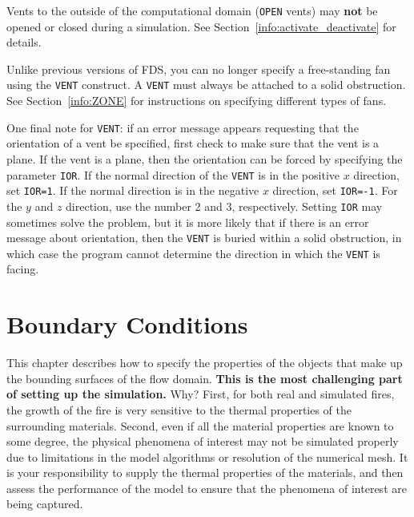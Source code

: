 \documentclass[11pt]{book}
\newcommand{\ct}{\tt\small}
\begin{document}
\begin{warning}
Vents to the outside of the computational domain ({\ct OPEN} vents)
may {\bf not} be opened or closed during a simulation. See Section~\ref{info:activate_deactivate} for details.
\end{warning}

\begin{warning}
Unlike previous versions of FDS, you can no longer specify a free-standing fan using the {\ct VENT}
construct. A {\ct VENT} must always be attached to a solid obstruction. See
Section~\ref{info:ZONE} for instructions on specifying different types of fans.
\end{warning}



One final note for {\ct VENT}: if an error message appears requesting that
the orientation of a vent be specified, first check to make sure that the vent is a plane.
If the vent is a plane, then the orientation can be forced by specifying the parameter {\ct IOR}.
If the normal direction of the {\ct VENT} is in the positive $x$ direction, set {\ct IOR=1}.
If the normal direction is in the negative $x$ direction, set {\ct IOR=-1}. For the $y$ and
$z$ direction, use the number 2 and 3, respectively. Setting {\ct IOR} may sometimes solve
the problem, but it is more likely that if there is an error message about orientation, then
the {\ct VENT} is buried within a solid obstruction, in which case the program cannot determine
the direction in which the {\ct VENT} is facing.











\chapter{Boundary Conditions}

This chapter describes how to specify the properties of the objects
that make up the bounding surfaces of the flow domain. {\bf This is
the most challenging part of setting up the simulation.} Why?  First,
for both real and simulated fires, the growth of the fire is very
sensitive to the thermal properties of the surrounding
materials. Second, even if all the material properties are known to
some degree, the physical phenomena of interest may not be simulated
properly due to limitations in the model algorithms or resolution of
the numerical mesh. It is your responsibility to supply the thermal
properties of the materials, and then assess the performance of the
model to ensure that the phenomena of interest are being captured.
\end{document}
